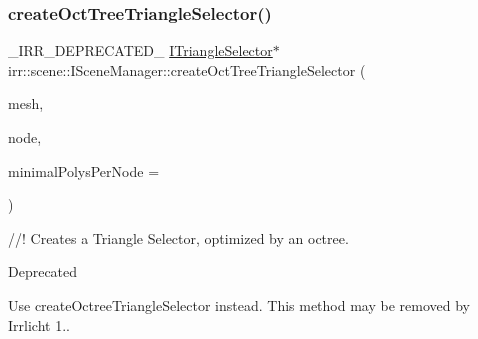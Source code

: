 \subsubsection{\texorpdfstring{create\+Oct\+Tree\+Triangle\+Selector()}{createOctTreeTriangleSelector()}\hspace{0.1cm}{\footnotesize\ttfamily [1/2]}}
{\footnotesize\ttfamily \+\_\+\+I\+R\+R\+\_\+\+D\+E\+P\+R\+E\+C\+A\+T\+E\+D\+\_\+ \hyperlink{classirr_1_1scene_1_1ITriangleSelector}{I\+Triangle\+Selector}$\ast$ irr\+::scene\+::\+I\+Scene\+Manager\+::create\+Oct\+Tree\+Triangle\+Selector (\begin{DoxyParamCaption}\item[{\hyperlink{classirr_1_1scene_1_1IMesh}{I\+Mesh} $\ast$}]{mesh,  }\item[{\hyperlink{classirr_1_1scene_1_1ISceneNode}{I\+Scene\+Node} $\ast$}]{node,  }\item[{\hyperlink{namespaceirr_ac66849b7a6ed16e30ebede579f9b47c6}{s32}}]{minimal\+Polys\+Per\+Node = {} }\end{DoxyParamCaption})\hspace{0.3cm}{\ttfamily [inline]}}



//! Creates a Triangle Selector, optimized by an octree. 

\begin{DoxyRefDesc}{Deprecated}
\item[\hyperlink{deprecated__deprecated000020}{Deprecated}]Use create\+Octree\+Triangle\+Selector instead. This method may be removed by Irrlicht 1.. \end{DoxyRefDesc}
\mbox{\label{classirr_1_1scene_1_1ISceneManager_a67f20d1a535645048f2f7e2b5c670656}} 
